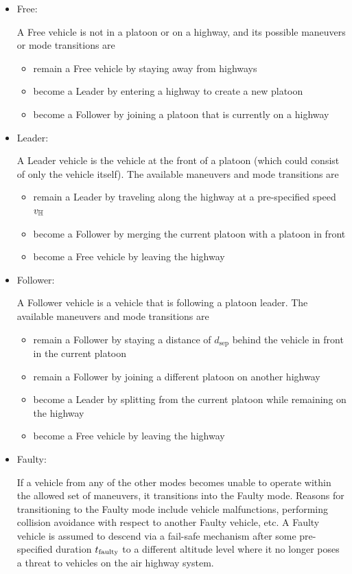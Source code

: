 \begin{itemize}
\item Free: 

A Free vehicle is not in a platoon or on a highway, and its possible maneuvers or mode transitions are
\begin{itemize}
\item remain a Free vehicle by staying away from highways
\item become a Leader by entering a highway to create a new platoon
\item become a Follower by joining a platoon that is currently on a highway
\end{itemize} 

\item Leader: 

A Leader vehicle is the vehicle at the front of a platoon (which could consist of only the vehicle itself). The available maneuvers and mode transitions are

\begin{itemize}
\item remain a Leader by traveling along the highway at a pre-specified speed $v_{\mathbb{H}}$
\item become a Follower by merging the current platoon with a platoon in front
\item become a Free vehicle by leaving the highway
\end{itemize}

\item Follower: 

A Follower vehicle is a vehicle that is following a platoon leader. The available maneuvers and mode transitions are 

\begin{itemize}
\item remain a Follower by staying a distance of $d_\text{sep}$ behind the vehicle in front in the current platoon
\item remain a Follower by joining a different platoon on another highway
\item become a Leader by splitting from the current platoon while remaining on the highway
\item become a Free vehicle by leaving the highway
\end{itemize}

\item Faulty: 

If a vehicle from any of the other modes becomes unable to operate within the allowed set of maneuvers, it transitions into the Faulty mode. Reasons for transitioning to the Faulty mode include vehicle malfunctions, performing collision avoidance with respect to another Faulty vehicle, etc. A Faulty vehicle is assumed to descend via a fail-safe mechanism after some pre-specified duration $t_\text{faulty}$ to a different altitude level where it no longer poses a threat to vehicles on the air highway system.


\end{itemize}
